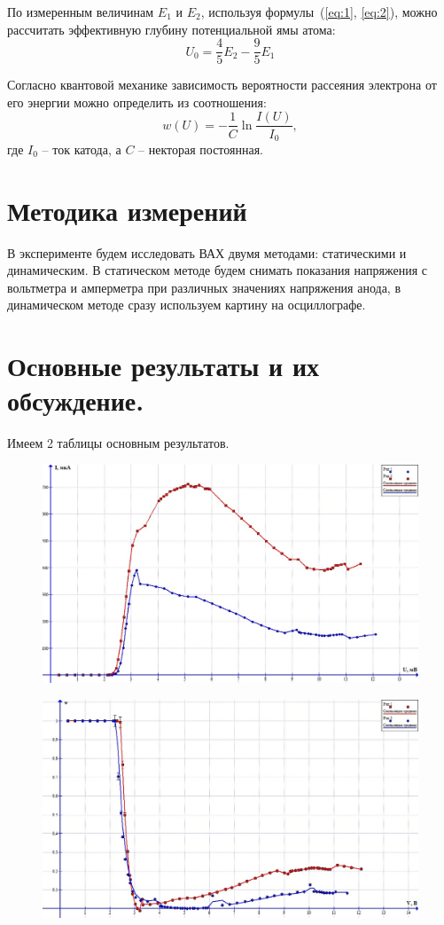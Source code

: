 \documentclass[%
 reprint,
 amsmath,amssymb,
 aps,
]{revtex4-2}
\begin{document}
По измеренным величинам $E_1$ и $E_2$, используя формулы~(\ref{eq:1}, \ref{eq:2}), можно рассчитать эффективную глубину потенциальной ямы атома:
\begin{equation}
\label{eq:U_0}
U_0 = \frac{4}{5}E_2 - \frac{9}{5}E_1
\end{equation}

Согласно квантовой механике зависимость вероятности рассеяния электрона от его энергии можно определить из соотношения:
\begin{equation}
\label{eq:w}
w(U) = -\frac{1}{C}\ln \frac{I(U)}{I_0},
\end{equation}
где $I_0$ -- ток катода, а $C$ -- некторая постоянная.

\section{Методика измерений}

В эксперименте будем исследовать ВАХ двумя методами: статическими и динамическим. В статическом методе будем снимать показания напряжения с вольтметра и амперметра при различных значениях напряжения анода, в динамическом методе сразу используем картину на осциллографе. 


\section{Основные результаты и их обсуждение.}
Имеем 2 таблицы основным результатов.

\begin{figure}[h!]
	\includegraphics[scale=0.5]{1.jpg}
\end{figure}
\begin{figure}[h!]
	\includegraphics[scale=0.4]{2.jpg}
\end{figure}
\end{document}
